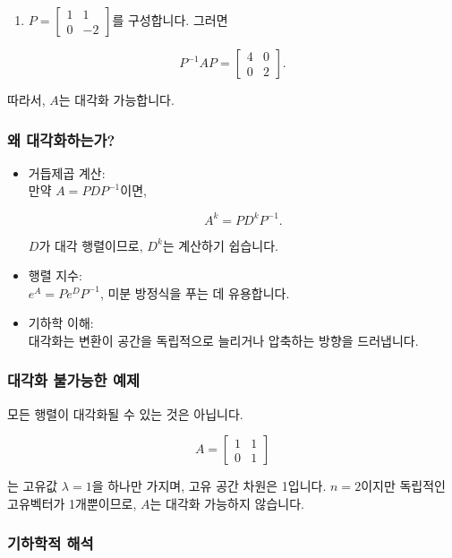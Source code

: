 \documentclass[
  12pt,
  a4paper,
]{article}
\begin{document}
\begin{enumerate}
\def\labelenumi{\arabic{enumi}.}
\item
  \(P = \begin{bmatrix} 1 & 1 \\ 0 & -2 \end{bmatrix}\)를 구성합니다. 그러면
\end{enumerate}

\[P^{-1} A P = \begin{bmatrix} 4 & 0 \\ 0 & 2 \end{bmatrix}.\]

따라서, \(A\)는 대각화 가능합니다.

\subsubsection{왜 대각화하는가?}\label{why-diagonalize}

\begin{itemize}
\item
  거듭제곱 계산:\\
  만약 \(A = P D P^{-1}\)이면,

  \[A^k = P D^k P^{-1}.\]

  \(D\)가 대각 행렬이므로, \(D^k\)는 계산하기 쉽습니다.
\item
  행렬 지수:\\
  \(e^A = P e^D P^{-1}\), 미분 방정식을 푸는 데 유용합니다.
\item
  기하학 이해:\\
  대각화는 변환이 공간을 독립적으로 늘리거나 압축하는 방향을 드러냅니다.
\end{itemize}

\subsubsection{대각화 불가능한 예제}\label{non-diagonalizable-example}

모든 행렬이 대각화될 수 있는 것은 아닙니다.

\[A = \begin{bmatrix} 1 & 1 \\ 0 & 1 \end{bmatrix}\]

는 고유값 \(\lambda = 1\)을 하나만 가지며, 고유 공간 차원은 1입니다. \(n=2\)이지만 독립적인 고유벡터가 1개뿐이므로, \(A\)는 대각화 가능하지 않습니다.

\subsubsection{기하학적 해석}\label{geometric-interpretation-17}
\end{document}
